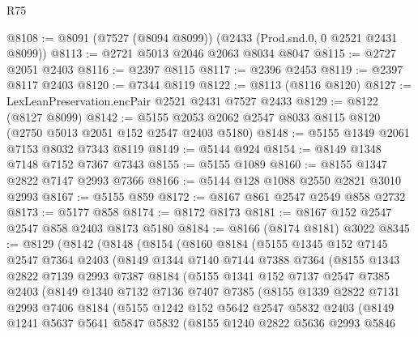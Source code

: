 \begin{lexlean}{R75}
\begin{coremodule}
@8108 := @8091 (@7527 (@8094 @8099)) (@2433 (Prod.snd.{0, 0} @2521 @2431 @8099))
@8113 := @2721 @5013 @2046 @2063 @8034 @8047
@8115 := @2727 @2051 @2403
@8116 := @2397 @8115
@8117 := @2396 @2453
@8119 := @2397 @8117 @2403
@8120 := @7344 @8119
@8122 := @8113 (@8116 @8120)
@8127 := LexLeanPreservation.encPair @2521 @2431 @7527 @2433
@8129 := @8122 (@8127 @8099)
@8142 := @5155 @2053 @2062 @2547 @8033 @8115 @8120 (@2750 @5013 @2051 @152 @2547 @2403 @5180)
@8148 := @5155 @1349 @2061 @7153 @8032 @7343 @8119
@8149 := @5144 @924
@8154 := @8149 @1348 @7148 @7152 @7367 @7343
@8155 := @5155 @1089
@8160 := @8155 @1347 @2822 @7147 @2993 @7366
@8166 := @5144 @128 @1088 @2550 @2821 @3010 @2993
@8167 := @5155 @859
@8172 := @8167 @861 @2547 @2549 @858 @2732
@8173 := @5177 @858
@8174 := @8172 @8173
@8181 := @8167 @152 @2547 @2547 @858 @2403 @8173 @5180
@8184 := @8166 (@8174 @8181) @3022
@8345 := @8129
    (@8142
      (@8148
        (@8154
          (@8160
            @8184
            (@5155
              @1345
              @152
              @7145
              @2547
              @7364
              @2403
              (@8149
                @1344
                @7140
                @7144
                @7388
                @7364
                (@8155
                  @1343
                  @2822
                  @7139
                  @2993
                  @7387
                  @8184
                  (@5155
                    @1341
                    @152
                    @7137
                    @2547
                    @7385
                    @2403
                    (@8149
                      @1340
                      @7132
                      @7136
                      @7407
                      @7385
                      (@8155
                        @1339
                        @2822
                        @7131
                        @2993
                        @7406
                        @8184
                        (@5155
                          @1242
                          @152
                          @5642
                          @2547
                          @5832
                          @2403
                          (@8149
                            @1241
                            @5637
                            @5641
                            @5847
                            @5832
                            (@8155
                              @1240
                              @2822
                              @5636
                              @2993
                              @5846

\end{coremodule}
\end{lexlean}
